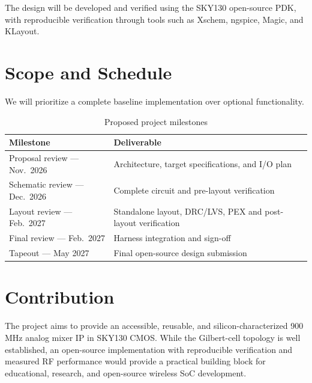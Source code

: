 \documentclass[11pt,letterpaper]{article}
\begin{document}
The design will be developed and verified using the
SKY130 open-source PDK, with reproducible verification
through tools such as Xschem, ngspice, Magic, and
KLayout.


\section{Scope and Schedule}

We will prioritize a complete baseline
implementation over optional functionality.

\begin{table}[htbp]
\centering
\caption{Proposed project milestones}
\label{tab:milestones}
\begin{tabularx}{\textwidth}{@{}p{}Y@{}}
\toprule
\textbf{Milestone} & \textbf{Deliverable} \\
\midrule

Proposal review --- Nov.\ 2026 &
Architecture, target specifications, and I/O plan \\

Schematic review --- Dec.\ 2026 &
Complete circuit and pre-layout verification \\

Layout review --- Feb.\ 2027 &
Standalone layout, DRC/LVS, PEX and post-layout
verification \\

Final review --- Feb.\ 2027 &
Harness integration and sign-off \\

Tapeout --- May 2027 &
Final open-source design submission \\

\bottomrule
\end{tabularx}
\end{table}

\section{Contribution}

The project aims to provide an accessible, reusable,
and silicon-characterized 900 MHz analog mixer IP
in SKY130 CMOS. While the Gilbert-cell topology is well established,
an open-source implementation with reproducible
verification and measured RF performance would provide
a practical building block for educational, research,
and open-source wireless SoC development.
\end{document}
